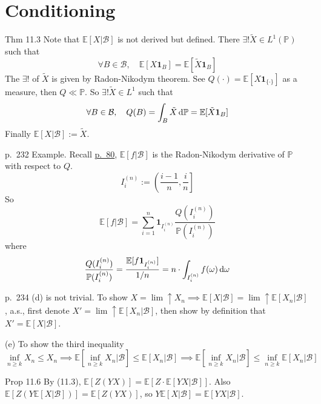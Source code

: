 \setcounter{section}{10}
\section{Conditioning}

\begin{note}{Thm 11.3}
    Note that $\mathbb{E}[X|\mathcal{B}]$ is not derived but defined. There $\exists!\tilde{X}\in L^1(\mathbb{P})$ such that 
    \[
    \forall B\in\mathcal{B},\quad \mathbb{E}[X\mathbf{1}_B]=\mathbb{E}[\tilde{X}\mathbf{1}_B]
    \]
    The $\exists!$ of $\tilde{X}$ is given by Radon-Nikodym theorem. See $Q(\cdot)=\mathbb{E}[X\mathbf{1}_{\{\cdot\}}]$ as a measure, then $Q\ll \mathbb{P}$. So $\exists!\tilde{X}\in L^1$ such that
    \[
    \forall B\in\mathcal{B},\quad Q(B)=\int_B \tilde{X}\mathop{}\!\mathrm{d} \mathbb{P}=\mathbb{E}[\tilde{X}\mathbf{1}_B]
    \]
    Finally $\mathbb{E}[X|\mathcal{B}]:=\tilde{X}.$
\end{note}

\begin{note}{p.~232}
    Example. Recall \hyperref[p.~80]{p.~80}, $\mathbb{E}[f|\mathcal{B}]$ is the Radon-Nikodym derivative of $\mathbb{P}$ with respect to $Q$.
    \[
    I_i^{(n)}:=\left( \frac{i-1}{n},\frac{i}{n} \right]
    \]
    So 
    \[
    \mathbb{E}[f|\mathcal{B}]=\sum_{i=1}^n \mathbf{1}_{I_i^{(n)}}\frac{Q(I_i^{(n)})}{\mathbb{P}(I_i^{(n)})}
    \]
    where
    \[
    \frac{Q(I_i^{(n)})}{\mathbb{P}(I_i^{(n)})}=\frac{\mathbb{E}[f\mathbf{1}_{I_i^{(n)}}]}{1/n}=n\cdot \int_{I_i^{(n)}}f(\omega)\mathop{}\!\mathrm{d}\omega
    \]
\end{note}

\begin{note}{p.~234}
    (d) is not trivial. To show $X=\lim \uparrow X_n\implies \mathbb{E}[X|\mathcal{B}]=\lim\uparrow\mathbb{E}[X_n|\mathcal{B}]$, a.s., first denote $X'=\lim\uparrow\mathbb{E}[X_n|\mathcal{B}]$, then show by definition that $X'=\mathbb{E}[X|\mathcal{B}]$.

    (e) To show the third inequality
    \[
    \inf_{n\ge k}X_n\le X_n
    \implies \mathbb{E}[\inf_{n\ge k}X_n|\mathcal{B}]\le\mathbb{E}[X_n|\mathcal{B}]
    \implies \mathbb{E}[\inf_{n\ge k}X_n|\mathcal{B}]\le\inf_{n\ge k}\mathbb{E}[X_n|\mathcal{B}]
    \]
\end{note}

\begin{note}{Prop 11.6}
    By (11.3), $\mathbb{E}[Z(YX)]=\mathbb{E}[Z\cdot\mathbb{E}[YX|\mathcal{B}]]$. Also $\mathbb{E}[Z(Y \mathbb{E}[X | \mathcal{B}])]=\mathbb{E}[Z (Y X)]$, so $Y \mathbb{E}[X | \mathcal{B}]=\mathbb{E}[YX|\mathcal{B}]$.
\end{note}


